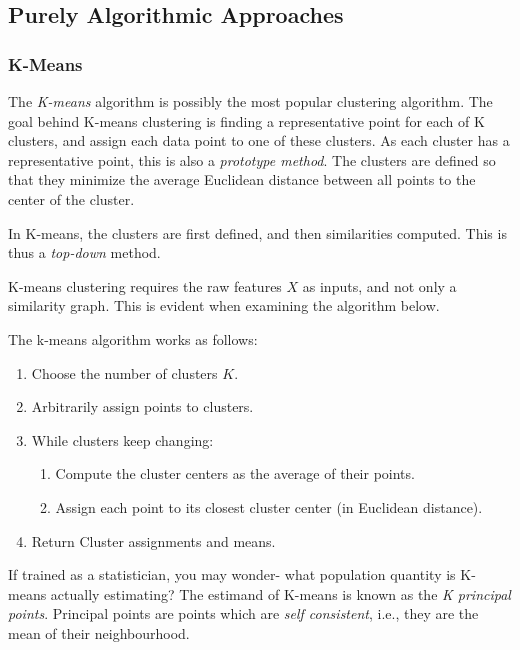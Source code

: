 \documentclass[]{book}
\providecommand{\tightlist}{%
  \setlength{\itemsep}{0pt}\setlength{\parskip}{0pt}}
\theoremstyle{definition}
\theoremstyle{definition}
\theoremstyle{definition}
\theoremstyle{remark}
\let\BeginKnitrBlock\begin \let\EndKnitrBlock\end
\begin{document}
\subsection{Purely Algorithmic
Approaches}\label{purely-algorithmic-approaches-1}

\subsubsection{K-Means}\label{k-means}

The \emph{K-means} algorithm is possibly the most popular clustering
algorithm. The goal behind K-means clustering is finding a
representative point for each of K clusters, and assign each data point
to one of these clusters. As each cluster has a representative point,
this is also a \emph{prototype method}. The clusters are defined so that
they minimize the average Euclidean distance between all points to the
center of the cluster.

In K-means, the clusters are first defined, and then similarities
computed. This is thus a \emph{top-down} method.

K-means clustering requires the raw features \(X\) as inputs, and not
only a similarity graph. This is evident when examining the algorithm
below.

The k-means algorithm works as follows:

\begin{enumerate}
\def\labelenumi{\arabic{enumi}.}
\tightlist
\item
  Choose the number of clusters \(K\).
\item
  Arbitrarily assign points to clusters.
\item
  While clusters keep changing:

  \begin{enumerate}
  \def\labelenumii{\arabic{enumii}.}
  \tightlist
  \item
    Compute the cluster centers as the average of their points.
  \item
    Assign each point to its closest cluster center (in Euclidean
    distance).
  \end{enumerate}
\item
  Return Cluster assignments and means.
\end{enumerate}

\BeginKnitrBlock{remark}
{}If trained as a statistician, you may wonder-
what population quantity is K-means actually estimating? The estimand of
K-means is known as the \emph{K principal points}. Principal points are
points which are \emph{self consistent}, i.e., they are the mean of
their neighbourhood.
\EndKnitrBlock{remark}
\end{document}
